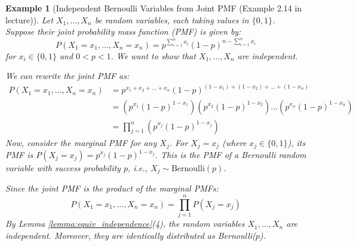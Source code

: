\documentclass[11pt]{article}
\newtheorem{example}[theorem]{Example}
\begin{document}
\begin{example}[Independent Bernoulli Variables from Joint PMF (Example 2.14 in lecture)]
\label{ex:indep_bernoulli}
Let $X_1, \dots, X_n$ be random variables, each taking values in $\{0, 1\}$. Suppose their joint probability mass function (PMF) is given by:
\begin{equation}
P(X_1=x_1, \dots, X_n=x_n) = p^{\sum_{i=1}^n x_i} (1-p)^{n - \sum_{i=1}^n x_i}
\end{equation}
for $x_i \in \{0,1\}$ and $0 < p < 1$. We want to show that $X_1, \dots, X_n$ are independent.

We can rewrite the joint PMF as:
\begin{align*}
P(X_1=x_1, \dots, X_n=x_n) &= p^{x_1 + x_2 + \dots + x_n} (1-p)^{(1-x_1) + (1-x_2) + \dots + (1-x_n)} \\
&= \left(p^{x_1} (1-p)^{1-x_1}\right) \left(p^{x_2} (1-p)^{1-x_2}\right) \dots \left(p^{x_n} (1-p)^{1-x_n}\right) \\
&= \prod_{j=1}^n \left(p^{x_j} (1-p)^{1-x_j}\right)
\end{align*}
Now, consider the marginal PMF for any $X_j$. For $X_j=x_j$ (where $x_j \in \{0,1\}$), its PMF is $P(X_j=x_j) = p^{x_j}(1-p)^{1-x_j}$. This is the PMF of a Bernoulli random variable with success probability $p$, i.e., $X_j \sim \text{Bernoulli}(p)$.

Since the joint PMF is the product of the marginal PMFs:
\begin{equation}
P(X_1=x_1, \dots, X_n=x_n) = \prod_{j=1}^n P(X_j=x_j)
\end{equation}
By Lemma \ref{lemma:equiv_independence}(4), the random variables $X_1, \dots, X_n$ are independent. Moreover, they are identically distributed as Bernoulli($p$).
\end{example}
\end{document}
